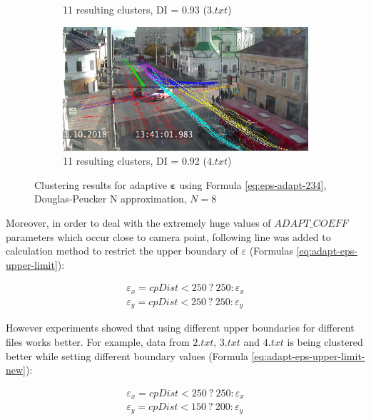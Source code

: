 \begin{figure}[!htb]
\begin{subfigure}[!htb]{0.23\textwidth}
		\caption{11 resulting clusters, DI = 0.93 ($3.txt$)}
		\label{fig:clust-res-1-rdp-n-diff-coeff-3}
	\end{subfigure}
	\hfill
	\begin{subfigure}[!htb]{0.23\textwidth}
		\centering{}
		\includegraphics[width=\textwidth]{images/cl-res/clust-res-1-rdp-n-diff-coeff-4.png}
		\caption{11 resulting clusters, DI = 0.92 ($4.txt$)}
		\label{fig:clust-res-1-rdp-n-diff-coeff-4}
	\end{subfigure}
	\caption{Clustering results for adaptive $\bm{\varepsilon}$ using Formula \ref{eq:eps-adapt-234}, Douglas-Peucker N approximation, $N = 8$}
	\label{fig:clust-res-1-rdp-n-diff-coeff}
\end{figure}

Moreover, in order to deal with the extremely huge values of $ADAPT\_COEFF$ parameters which occur close to camera point, following line was added to calculation method to restrict the upper boundary of $\varepsilon$ (Formulas \ref{eq:adapt-eps-upper-limit}):

\begin{subequations}\label{eq:adapt-eps-upper-limit}
	\begin{align}
		\varepsilon_x = cpDist < 250\ ?\ 250 : \varepsilon_x \\
		\varepsilon_y = cpDist < 250\ ?\ 250 : \varepsilon_y
	\end{align}
\end{subequations}

However experiments showed that using different upper boundaries for different files works better. For example, data from $2.txt$, $3.txt$ and $4.txt$ is being clustered better while setting different boundary values (Formula \ref{eq:adapt-eps-upper-limit-new}):

\begin{subequations}\label{eq:adapt-eps-upper-limit-new}
	\begin{align}
	\varepsilon_x = cpDist < 250\ ?\ 250 : \varepsilon_x \\
	\varepsilon_y = cpDist < 150\ ?\ 200 : \varepsilon_y
	\end{align}
\end{subequations}


